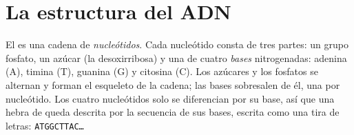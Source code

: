 \section{La estructura del ADN}

\begin{definition}[Nucleótido]\label{def:g10:universal-dna:nucleotide}
El  es una cadena de \emph{nucleótidos}. Cada
nucleótido consta de tres partes: un grupo fosfato, un azúcar (la
desoxirribosa) y una de cuatro \emph{bases}
nitrogenadas: adenina (A), timina (T), guanina (G) y citosina (C). Los
azúcares y los fosfatos se alternan y forman el esqueleto de la cadena;
las bases sobresalen de él, una por nucleótido. Los cuatro nucleótidos
solo se diferencian por su base, así que una hebra de  queda
descrita por la secuencia de sus bases, escrita como una tira de
letras: \texttt{ATGGCTTAC\dots}
\end{definition}

